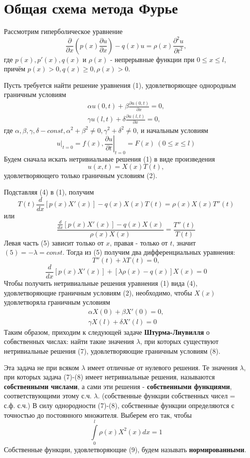 \section{Общая схема метода Фурье}
Рассмотрим гиперболическое уравнение
\[
	\frac{\partial}{\partial x} \left( p(x) \frac{\partial u}{\partial x}\right) - q(x) u = \rho(x) \frac{\partial^2 u}{\partial t^2}, \tag{1}
\]
где $p(x), p'(x), q(x)$ и $\rho(x)$ - непрерывные функции при $0 \le x \le l$, причём $p(x) > 0, q(x) \ge 0, \rho(x) > 0$.

Пусть требуется найти решение уравнения (1), удовлетворяющее однородным граничным условиям
\[
	\begin{aligned}
		\alpha u(0,t) + \beta \frac{\partial u(0,t)}{\partial x} = 0, \\
		\gamma u(l,t) + \delta \frac{\partial u(l,t)}{\partial x} = 0,
	\end{aligned}
	\tag{2}
\]
где $\alpha, \beta, \gamma, \delta - const, \alpha^2 + \beta^2 \ne 0, \gamma^2 + \delta^2 \ne 0$, и начальным условиям
\[
	\left. u \right|_{t=0} = f(x), \left. \frac{\partial u}{\partial t}\right|_{t=0} = F(x) ~ (0 \le x \le l) \tag{3}
\]
Будем сначала искать нетривиальные решения (1) в виде произведения
\[
	u(x, t) = X(x) T(t), \tag{4}
\]
удовлетворяющего только граничным условиям (2).

Подставляя (4) в (1), получим
\[
	T(t) \frac{d}{dx} \left[ p(x) X'(x)\right] - q(x) X(x) T(t) = \rho(x) X(x) T''(t)
\]
или
\[
	\frac{\frac{d}{dx} \left[ p(x) X'(x)\right] - q(x) X(x)}{\rho(x) X(x)} = \frac{T''(t)}{T(t)} \tag{5}
\]
Левая часть (5) зависит только от $x$, правая - только от $t$, значит $(5) = -\lambda = const$. Тогда из (5) получим два дифференциальных уравнения:
\[
	T''(t) + \lambda T(t) = 0, \tag{6}
\]
\[
	\frac{d}{dx} \left[ p(x) X'(x) \right] + \left[ \lambda \rho(x) - q(x) \right] X(x) = 0 \tag{7}
\]
Чтобы получить нетривиальные решения уравнения (1) вида (4), удовлетворяющие граничным условиям (2), необходимо, чтобы $X(x)$ удовлетворяла граничным условиям
\[
	\begin{aligned}
		\alpha X(0) + \beta X'(0) = 0, \\
		\gamma X(l) + \delta X'(l) = 0 
	\end{aligned} \tag{8}
\]
Таким образом, приходим к следующей задаче \textbf{Штурма-Лиувилля} о собвственных числах: найти такие значения $\lambda$, при которых существуют нетривиальные решения (7), удовлетворяющие граничным условиям (8).

Эта задача не при всяком $\lambda$ имеет отличные от нулевого решения. Те значения $\lambda$, при которых задача (7)-(8) имеет нетривиальные решения, называются \textbf{собственными числами}, а сами эти решения - \textbf{собственными функциями}, соответствующими этому с.ч. $\lambda$. (собственные функции собственных чисел = с.ф. с.ч.) В силу однородности (7)-(8), собственные функции определяются с точностью до постоянного множителя. Выберем его так, чтобы
\[
	\int\limits_0^l \rho(x) X^2(x) dx = 1 \tag{9}
\]
Собственные функции, удовлетворяющие (9), будем называть \textbf{нормированными}.

